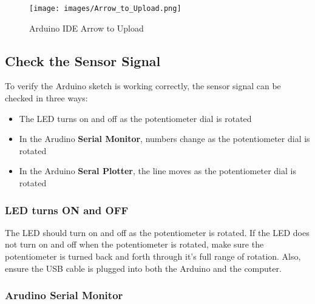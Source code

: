\documentclass{book}
\makeatletter
\def\maxwidth{\ifdim\Gin@nat@width>\linewidth\linewidth
\else\Gin@nat@width\fi}
\let\Oldincludegraphics\includegraphics
\renewcommand{\includegraphics}[1]{\Oldincludegraphics[width=.8\maxwidth]{#1}}
\providecommand{\tightlist}{%
      \setlength{\itemsep}{0pt}\setlength{\parskip}{0pt}}
\makeatother
\begin{document}
\begin{figure}
\centering
\texttt{[image: images/Arrow\_to\_Upload.png]}
\caption{Arduino IDE Arrow to Upload}
\end{figure}
    




    
        \hypertarget{check-the-sensor-signal}{%
\subsection{Check the Sensor Signal}\label{check-the-sensor-signal}}
    




    
        To verify the Arduino sketch is working correctly, the sensor signal can
be checked in three ways:

\begin{itemize}
\tightlist
\item
  The LED turns on and off as the potentiometer dial is rotated
\item
  In the Arudino \textbf{Serial Monitor}, numbers change as the
  potentiometer dial is rotated
\item
  In the Arduino \textbf{Seral Plotter}, the line moves as the
  potentiometer dial is rotated
\end{itemize}
    




    
        \hypertarget{led-turns-on-and-off}{%
\subsubsection{LED turns ON and OFF}\label{led-turns-on-and-off}}

The LED should turn on and off as the potentiometer is rotated. If the
LED does not turn on and off when the potentiometer is rotated, make
sure the potentiometer is turned back and forth through it's full range
of rotation. Also, ensure the USB cable is plugged into both the Arduino
and the computer.
    




    
        \hypertarget{arudino-serial-monitor}{%
\subsubsection{Arudino Serial Monitor}\label{arudino-serial-monitor}}
\end{document}

